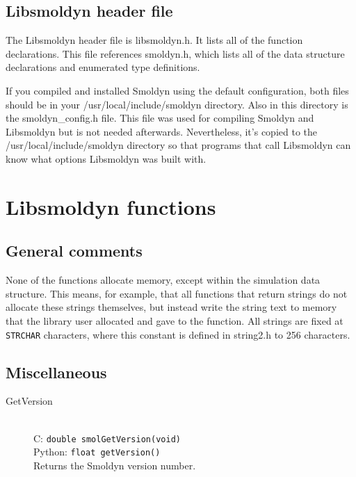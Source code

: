 \documentclass {book}
\newcommand {\ttt} {\texttt}
\begin{document}
\section{Libsmoldyn header file}

The Libsmoldyn header file is libsmoldyn.h. It lists all of the function declarations. This file references smoldyn.h, which lists all of the data structure declarations and enumerated type definitions.

If you compiled and installed Smoldyn using the default configuration, both files should be in your /usr/local/include/smoldyn directory. Also in this directory is the smoldyn\_config.h file. This file was used for compiling Smoldyn and Libsmoldyn but is not needed afterwards. Nevertheless, it's copied to the /usr/local/include/smoldyn directory so that programs that call Libsmoldyn can know what options Libsmoldyn was built with.


\chapter{Libsmoldyn functions}

\section{General comments}

None of the functions allocate memory, except within the simulation data structure. This means, for example, that all functions that return strings do not allocate these strings themselves, but instead write the string text to memory that the library user allocated and gave to the function.
All strings are fixed at \ttt{STRCHAR} characters, where this constant is defined in string2.h to 256 characters.

\section{Miscellaneous}

\begin{description}

\item[GetVersion]
\hfill \\
C: \ttt{double smolGetVersion(void)}\\
Python: \ttt{float getVersion()}\\
Returns the Smoldyn version number.

\end{description}
\end{document}
